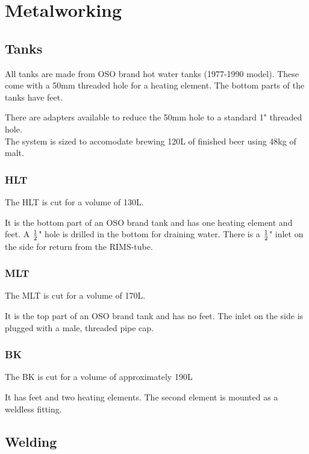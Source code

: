 \documentclass[11pt,fleqn]{book} %
\begin{document}

\chapter{Metalworking}

\section{Tanks}

All tanks are made from OSO brand hot water tanks (1977-1990 model). These come with a 50mm threaded hole for a heating element. The bottom parts of the tanks have feet.

There are adapters available to reduce the 50mm hole to a standard 1" threaded hole.\\

The system is sized to accomodate brewing 120L of finished beer using 48kg of malt.

\subsection{HLT}

The HLT is cut for a volume of 130L.

It is the bottom part of an OSO brand tank and has one heating element and feet. A $1 \over 2$" hole is drilled in the bottom for draining water.  There is a $1 \over 2$" inlet on the side for return from the RIMS-tube.

\subsection{MLT}

The MLT is cut for a volume of 170L. 

It is the top part of an OSO brand tank and has no feet. The inlet on the side is plugged with a male, threaded pipe cap.

\subsection{BK}

The BK is cut for a volume of approximately 190L

It has feet and two heating elements. The second element is mounted as a weldless fitting.

\section{Welding}
\end{document}
